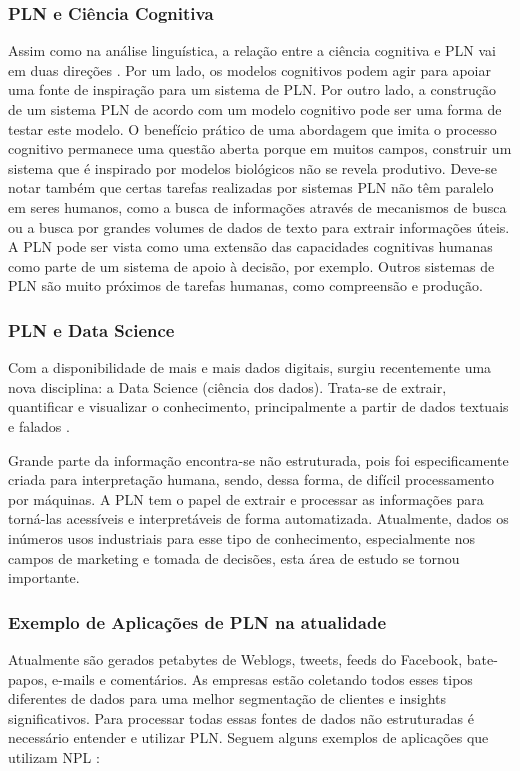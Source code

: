 \documentclass[
	12pt,				%
	openright,			%
	oneside,			%
	a4paper,			%
	english,			%
	spanish,			%
	brazil				%
	]{abntex2}
\begin{document}
	\subsubsection*{PLN e Ciência Cognitiva}
	Assim como na análise linguística, a relação entre a ciência cognitiva e PLN vai em duas direções \cite{book_natural_lang}. Por um lado, os modelos cognitivos podem agir para apoiar uma fonte de inspiração para um sistema de PLN. Por outro lado, a construção de um sistema PLN de acordo com um modelo cognitivo pode ser uma forma de testar este modelo. O benefício prático de uma abordagem que imita o processo cognitivo permanece uma questão aberta porque em muitos campos, construir um sistema que é inspirado por modelos biológicos não se revela produtivo. Deve-se notar também que certas tarefas realizadas por sistemas PLN não têm paralelo em seres humanos, como a busca de informações através de mecanismos de busca ou a busca por grandes volumes de dados de texto para extrair informações úteis. A PLN pode ser vista como uma extensão das capacidades cognitivas humanas como parte de um sistema de apoio à decisão, por exemplo. Outros sistemas de PLN são muito próximos de tarefas humanas, como compreensão e produção.
	
	\subsubsection*{PLN e Data Science}	
	Com a disponibilidade de mais e mais dados digitais, surgiu recentemente uma nova disciplina: a Data Science (ciência dos dados). Trata-se de extrair, quantificar e visualizar o conhecimento, principalmente a partir de dados textuais e falados \cite{book_natural_lang}. 
	
	Grande parte da informação encontra-se não estruturada, pois foi especificamente criada para interpretação humana, sendo, dessa forma, de difícil processamento por máquinas. A PLN tem o papel de extrair e processar as informações para torná-las acessíveis e interpretáveis de forma automatizada. Atualmente, dados os inúmeros usos industriais para esse tipo de conhecimento, especialmente nos campos de marketing e tomada de decisões, esta área de estudo se tornou importante.

	\subsubsection*{Exemplo de Aplicações de PLN na atualidade}
	Atualmente são gerados petabytes de Weblogs, tweets, feeds do Facebook, bate-papos, e-mails e comentários. As empresas estão coletando todos esses tipos diferentes de dados para uma melhor segmentação de clientes e insights significativos. Para processar todas essas fontes de dados não estruturadas é necessário entender e utilizar PLN.
Seguem alguns exemplos de aplicações que utilizam NPL \cite{book_natlang_python}:
\end{document}
